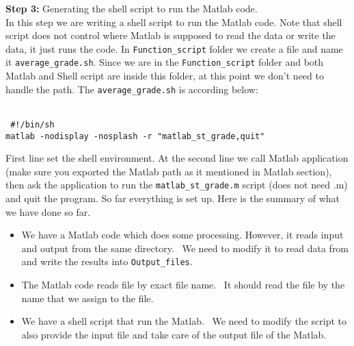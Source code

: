 
\textbf{Step 3:} Generating the shell script to run the Matlab code. \\

\noindent
In this step we are writing a shell script to run the Matlab code. Note that shell script does not control where Matlab is supposed to read the data or write the data, it just runs the code. In \texttt{Function\_script} folder we create a file and name it \texttt{average\_grade.sh}. Since we are in the \texttt{Function\_script} folder and both Matlab and Shell script are inside this folder, at this point we don't need to handle the path.  The  \texttt{average\_grade.sh} is according below:\\
 
 \begin{mdframed}[hidealllines=true,backgroundcolor=gray!20]
 \begin{singlespace}
 \fontsize{10pt}{1pt}
\texttt{
\\
\noindent
{ \color{matlab_green} \#!/bin/sh} \\
matlab -nodisplay -nosplash -r {\color{red}"matlab\_st\_grade,quit"}\\
 }
 \end{singlespace}
\end{mdframed}

\noindent
First line set the shell environment. At the second line we call Matlab application (make sure you exported the Matlab path as it mentioned in Matlab section), then ask the application to run  the \texttt{matlab\_st\_grade.m} script (does not need .m) and quit the program.  So far everything is set up. Here is the summary of what we have done so far. \\

\begin{itemize}

\item{We have a Matlab code which does some processing. However, it reads input and output from the same directory. \tab \ We need to modify it to read data from and write the results into \texttt{Output\_files}.}
\item{The Matlab code reads file by exact file name. \tab \ It should read the file by the name that we assign to the file.}
\item{We have a shell script that run the Matlab. \tab \ We need to modify the script to also provide the input file and take care of the output file of the Matlab.}
\end{itemize}



